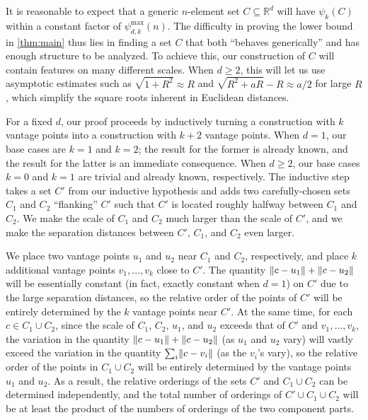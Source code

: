 \documentclass[11pt]{amsart}
\theoremstyle{definition}
\DeclarePairedDelimiter{\Abs}{\lVert}{\rVert}
\newcommand{\perm}{\psi^{\mathrm{max}}}
\newcommand{\RR}{\mathbb{R}}
\begin{document}
It is reasonable to expect that a generic $n$-element set $C\subseteq \RR^d$ will have $\psi_{k}(C)$ within a constant factor of $\perm_{d,k}(n)$. The difficulty in proving the lower bound in \cref{thm:main} thus lies in finding a set $C$ that both ``behaves generically'' and has enough structure to be analyzed.  To achieve this, our construction of $C$ will contain features on many different scales.  When $d \geq 2$, this will let us use asymptotic estimates such as $\sqrt{1+R^2}\approx R$ and $\sqrt{R^2 + aR} - R \approx a/2$ for large $R$, which simplify the square roots inherent in Euclidean distances.

For a fixed $d$, our proof proceeds by inductively turning a construction with $k$ vantage points into a construction with $k+2$ vantage points.  When $d=1$, our base cases are $k=1$ and $k=2$; the result for the former is already known, and the result for the latter is an immediate consequence.  When $d \geq 2$, our base cases $k = 0$ and $k = 1$ are trivial and already known, respectively. The inductive step takes a set $C'$ from our inductive hypothesis and adds two carefully-chosen sets $C_1$ and $C_2$ ``flanking'' $C'$ such that $C'$ is located roughly halfway between $C_1$ and $C_2$. We make the scale of $C_1$ and $C_2$ much larger than the scale of $C'$, and we make the separation distances between $C'$, $C_1$, and $C_2$ even larger.

We place two vantage points $u_1$ and $u_2$ near $C_1$ and $C_2$, respectively, and place $k$ additional vantage points $v_1, \ldots, v_k$ close to $C'$.  The quantity $\Abs{c - u_1} + \Abs{c - u_2}$ will be essentially constant (in fact, exactly constant when $d=1$) on $C'$ due to the large separation distances, so the relative order of the points of $C'$ will be entirely determined by the $k$ vantage points near $C'$.  At the same time, for each $c\in C_1\cup C_2$, since the scale of $C_1$, $C_2$, $u_1$, and $u_2$ exceeds that of $C'$ and $v_1, \ldots, v_k$, the variation in the quantity $\Abs{c - u_1} + \Abs{c - u_2}$ (as $u_1$ and $u_2$ vary) will vastly exceed the variation in the quantity $\sum_i \Abs{c-v_i}$ (as the $v_i$'s vary), so the relative order of the points in $C_1 \cup C_2$ will be entirely determined by the vantage points $u_1$ and $u_2$. As a result, the relative orderings of the sets $C'$ and $C_1 \cup C_2$ can be determined independently, and the total number of orderings of $C' \cup C_1 \cup C_2$ will be at least the product of the numbers of orderings of the two component parts.
\end{document}
